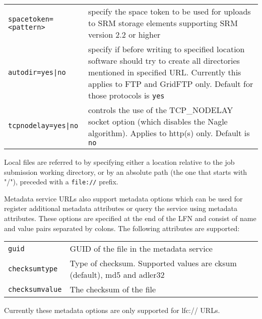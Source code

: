 \begin{tabular}{lp{10cm}}
   \verb#spacetoken=<pattern># & specify the space token to be used for
   uploads to SRM storage elements supporting SRM version 2.2 or higher\\
   \verb#autodir=yes|no# & specify if before writing to specified location
   software should try to create all directories mentioned in specified
   URL. Currently this applies to FTP and GridFTP only. Default for those
   protocols is \verb#yes#\\
   \verb#tcpnodelay=yes|no# & controls the use of the TCP\_NODELAY
   socket option (which disables the Nagle algorithm). Applies to
   http(s) only. Default is \verb#no#\\ 
\end{tabular}

Local files are referred to by specifying either a location relative
to the job submission working directory, or by an absolute path (the
one that starts with "/"), preceded with a \verb#file://# prefix.

Metadata service URLs also support metadata options which can be used
for register additional metadata attributes or query the service using
metadata attributes. These options are specified at the end of the LFN
and consist of name and value pairs separated by colons. The following
attributes are supported:

\begin{tabular}{lp{10cm}}
   \verb#guid# & GUID of the file in the metadata service \\
   \verb#checksumtype# & Type of checksum. Supported values are cksum
   (default), md5 and adler32 \\
   \verb#checksumvalue# & The checksum of the file \\
\end{tabular}

Currently these metadata options are only supported for lfc:// URLs.

